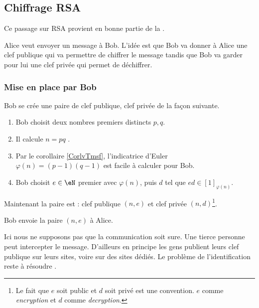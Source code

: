 \subsection{Chiffrage RSA}
\label{subSecEVaFYi}

Ce passage sur RSA provient en bonne partie de la .

Alice veut envoyer un message à Bob. L'idée est que Bob va donner à Alice une clef publique qui va permettre de chiffrer le message tandis que Bob va garder pour lui une clef privée qui permet de déchiffrer.

\subsubsection{Mise en place par Bob}

Bob se crée une paire de clef publique, clef privée de la façon suivante.
\begin{enumerate}
    \item
        Bob choisit deux nombres premiers distincts \( p,q\).
    \item
        Il calcule \( n=pq\) .
    \item
        Par le corollaire \ref{CorlvTmsf}, l'indicatrice d'Euler \( \varphi(n)=(p-1)(q-1)\) est facile à calculer pour Bob.
    \item
        Bob choisit \( e\in \eN\) premier avec \( \varphi(n)\), puis \( d\) tel que \( ed\in[1]_{\varphi(n)}\).
\end{enumerate}
Maintenant la paire est : clef publique \( (n,e)\) et clef privée \( (n,d)\)\footnote{Le fait que \( e\) soit public et \( d\) soit privé est une convention. \( e\) comme  \emph{encryption} et \( d\) comme \emph{decryption}.}.

Bob envoie la paire \( (n,e)\) à Alice. 

\begin{remark}
    Ici nous ne supposons pas que la communication soit sure. Une tierce personne peut intercepter le message. D'ailleurs en principe les gens publient leurs clef publique sur leurs sites, voire sur des sites dédiés. Le problème de l'identification reste à résoudre .
\end{remark}

